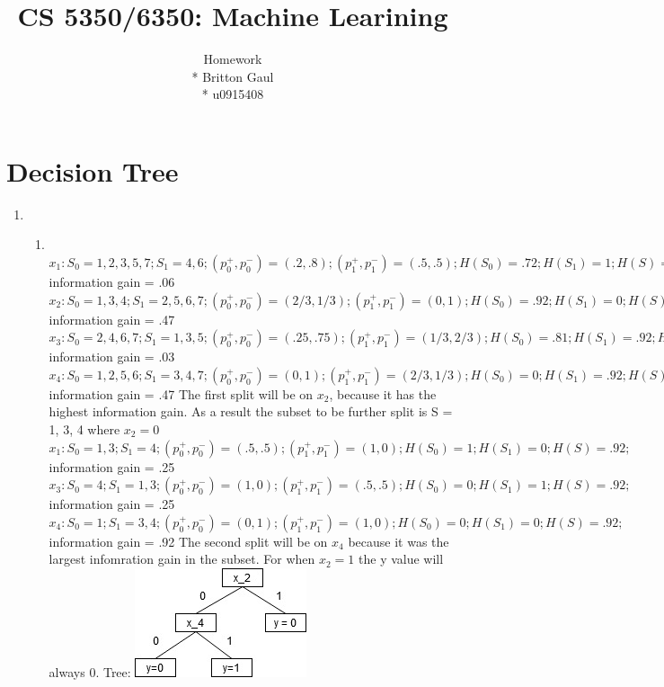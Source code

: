 \documentclass[12pt, fullpage,letterpaper]{article}
\title{CS 5350/6350: Machine Learining \semester}
\author{Homework \assignmentId \\* Britton Gaul \\* u0915408}
\begin{document}
\maketitle





\section{Decision Tree}

\begin{enumerate}
\item~ 
\begin{enumerate}
\item~
\newline $x_1: S_0 = 1, 2, 3, 5, 7; S_1 = 4, 6; (p_0^+, p_0^-)=(.2, .8); (p_1^+, p_1^-)=(.5, .5); H(S_0)=.72; H(S_1)=1; H(S)=.86;$  information gain = .06
\newline $x_2: S_0 = 1, 3, 4; S_1 = 2, 5, 6, 7; (p_0^+, p_0^-)=(2/3, 1/3); (p_1^+, p_1^-)=(0, 1); H(S_0)=.92; H(S_1)=0; H(S)=.86;$  information gain = .47
\newline $x_3: S_0 = 2, 4, 6, 7; S_1 = 1, 3, 5; (p_0^+, p_0^-)=(.25, .75); (p_1^+, p_1^-)=(1/3, 2/3); H(S_0)=.81; H(S_1)=.92; H(S)=.86;$  information gain = .03
\newline $x_4: S_0 = 1, 2, 5, 6; S_1 = 3, 4, 7; (p_0^+, p_0^-)=(0, 1); (p_1^+, p_1^-)=(2/3, 1/3); H(S_0)=0; H(S_1)=.92; H(S)=.86;$  information gain = .47
\newline The first split will be on $x_2$, because it has the highest information gain. As a result the subset to be further split is S = 1, 3, 4 where $x_2=0$
\newline $x_1: S_0 = 1, 3; S_1 = 4; (p_0^+, p_0^-)=(.5, .5); (p_1^+, p_1^-)=(1, 0); H(S_0)=1; H(S_1)=0; H(S)=.92;$  information gain = .25
\newline $x_3: S_0 = 4; S_1 = 1, 3; (p_0^+, p_0^-)=(1, 0); (p_1^+, p_1^-)=(.5, .5); H(S_0)=0; H(S_1)=1; H(S)=.92;$  information gain = .25
\newline $x_4: S_0 = 1; S_1 = 3, 4; (p_0^+, p_0^-)=(0, 1); (p_1^+, p_1^-)=(1, 0); H(S_0)=0; H(S_1)=0; H(S)=.92;$  information gain = .92
\newline The second split will be on $x_4$ because it was the largest infomration gain in the subset. For when $x_2=1$ the y value will always 0. 
\newline Tree:
\newline \includegraphics{cs5350hw1_1.jpg}

\end{enumerate}
\end{enumerate}
\end{document}
